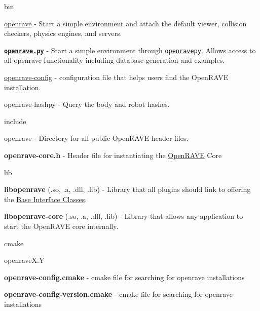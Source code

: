 \begin{DoxyItemize}
\item bin
\begin{DoxyItemize}
\item \hyperlink{p__basic__usage}{openrave} -\/ Start a simple environment and attach the default viewer, collision checkers, physics engines, and servers.
\item \href{http://openrave.org/en/main/command_line_tools.html#openrave-py}{\tt {\bfseries openrave.py}} -\/ Start a simple environment through \href{http://openrave.org/en/main/tutorials/openravepy_beginning.html#openravepy-beginning}{\tt openravepy}. Allows access to all openrave functionality including database generation and examples.
\item \hyperlink{openrave__config}{openrave-\/config} -\/ configuration file that helps users find the OpenRAVE installation.
\item openrave-\/hashpy -\/ Query the body and robot hashes.
\end{DoxyItemize}
\item include
\begin{DoxyItemize}
\item openrave -\/ Directory for all public OpenRAVE header files.
\item {\bfseries openrave-\/core.h} -\/ Header file for instantiating the \hyperlink{namespaceOpenRAVE}{OpenRAVE} Core
\end{DoxyItemize}
\item lib
\begin{DoxyItemize}
\item {\bfseries libopenrave} (.so, .a, .dll, .lib) -\/ Library that all plugins should link to offering the \hyperlink{group__interfaces}{Base Interface Classes}.
\item {\bfseries libopenrave-\/core} (.so, .a, .dll, .lib) -\/ Library that allows any application to start the OpenRAVE core internally.
\item cmake
\begin{DoxyItemize}
\item openraveX.Y
\begin{DoxyItemize}
\item {\bfseries openrave-\/config.cmake} -\/ cmake file for searching for openrave installations
\item {\bfseries openrave-\/config-\/version.cmake} -\/ cmake file for searching for openrave installations
\end{DoxyItemize}
\end{DoxyItemize}

\end{DoxyItemize}
\end{DoxyItemize}
